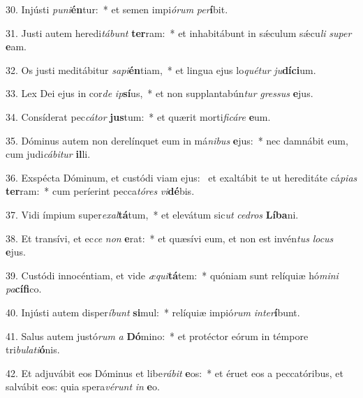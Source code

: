 30. Injústi \textit{pu}\textit{ni}\textbf{én}tur:~*  et semen impi\textit{ó}\textit{rum} \textit{per}\textbf{í}bit.\

31. Justi autem heredi\textit{tá}\textit{bunt} \textbf{ter}ram:~*  et inhabitábunt in sǽculum sǽcu\textit{li} \textit{su}\textit{per} \textbf{e}am.\

32. Os justi meditábitur \textit{sa}\textit{pi}\textbf{én}tiam,~*  et lingua ejus lo\textit{qué}\textit{tur} \textit{ju}\textbf{dí}\textbf{ci}um.\

33. Lex Dei ejus in cor\textit{de} \textit{ip}\textbf{sí}us,~*  et non supplantabún\textit{tur} \textit{gres}\textit{sus} \textbf{e}jus.\

34. Consíderat pec\textit{cá}\textit{tor} \textbf{jus}tum:~*  et quærit morti\textit{fi}\textit{cá}\textit{re} \textbf{e}um.\

35. Dóminus autem non derelínquet eum in má\textit{ni}\textit{bus} \textbf{e}jus:~*  nec damnábit eum, cum judi\textit{cá}\textit{bi}\textit{tur} \textbf{il}li.\

36. Exspécta Dóminum, et custódi viam ejus: \dag\  et exaltábit te ut hereditáte cá\textit{pi}\textit{as} \textbf{ter}ram:~*  cum períerint pecca\textit{tó}\textit{res} \textit{vi}\textbf{dé}bis.\

37. Vidi ímpium super\textit{ex}\textit{al}\textbf{tá}tum,~*  et elevátum sic\textit{ut} \textit{ce}\textit{dros} \textbf{Lí}\textbf{ba}ni.\

38. Et transívi, et ec\textit{ce} \textit{non} \textbf{e}rat:~*  et quæsívi eum, et non est invén\textit{tus} \textit{lo}\textit{cus} \textbf{e}jus.\

39. Custódi innocéntiam, et vide \textit{æ}\textit{qui}\textbf{tá}tem:~*  quóniam sunt relíquiæ hó\textit{mi}\textit{ni} \textit{pa}\textbf{cí}\textbf{fi}co.\

40. Injústi autem disper\textit{í}\textit{bunt} \textbf{si}mul:~*  relíquiæ impió\textit{rum} \textit{in}\textit{ter}\textbf{í}bunt.\

41. Salus autem justó\textit{rum} \textit{a} \textbf{Dó}mino:~*  et protéctor eórum in témpore tri\textit{bu}\textit{la}\textit{ti}\textbf{ó}nis.\

42. Et adjuvábit eos Dóminus et libe\textit{rá}\textit{bit} \textbf{e}os:~*  et éruet eos a peccatóribus, et salvábit eos: quia spera\textit{vé}\textit{runt} \textit{in} \textbf{e}o.\

